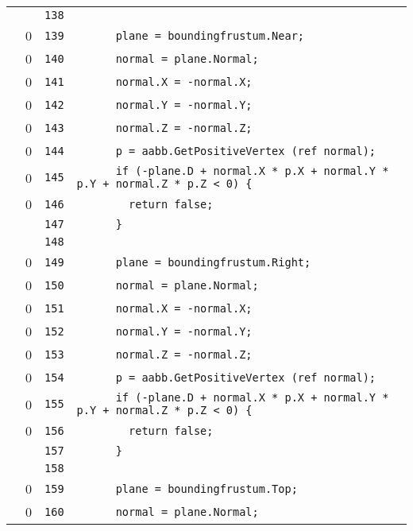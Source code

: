 \documentclass[a4paper,10pt]{article}
\begin{document}
\begin{longtable}[l]{lrrl}
\cellcolor{gray} &  & \verb~138~ & \verb~~\\
\cellcolor{red} & 0 & \verb~139~ & \verb~      plane = boundingfrustum.Near;~\\
\cellcolor{red} & 0 & \verb~140~ & \verb~      normal = plane.Normal;~\\
\cellcolor{red} & 0 & \verb~141~ & \verb~      normal.X = -normal.X;~\\
\cellcolor{red} & 0 & \verb~142~ & \verb~      normal.Y = -normal.Y;~\\
\cellcolor{red} & 0 & \verb~143~ & \verb~      normal.Z = -normal.Z;~\\
\cellcolor{red} & 0 & \verb~144~ & \verb~      p = aabb.GetPositiveVertex (ref normal);~\\
\cellcolor{red} & 0 & \verb~145~ & \verb~      if (-plane.D + normal.X * p.X + normal.Y * p.Y + normal.Z * p.Z < 0) {~\\
\cellcolor{red} & 0 & \verb~146~ & \verb~        return false;~\\
\cellcolor{gray} &  & \verb~147~ & \verb~      }~\\
\cellcolor{gray} &  & \verb~148~ & \verb~~\\
\cellcolor{red} & 0 & \verb~149~ & \verb~      plane = boundingfrustum.Right;~\\
\cellcolor{red} & 0 & \verb~150~ & \verb~      normal = plane.Normal;~\\
\cellcolor{red} & 0 & \verb~151~ & \verb~      normal.X = -normal.X;~\\
\cellcolor{red} & 0 & \verb~152~ & \verb~      normal.Y = -normal.Y;~\\
\cellcolor{red} & 0 & \verb~153~ & \verb~      normal.Z = -normal.Z;~\\
\cellcolor{red} & 0 & \verb~154~ & \verb~      p = aabb.GetPositiveVertex (ref normal);~\\
\cellcolor{red} & 0 & \verb~155~ & \verb~      if (-plane.D + normal.X * p.X + normal.Y * p.Y + normal.Z * p.Z < 0) {~\\
\cellcolor{red} & 0 & \verb~156~ & \verb~        return false;~\\
\cellcolor{gray} &  & \verb~157~ & \verb~      }~\\
\cellcolor{gray} &  & \verb~158~ & \verb~~\\
\cellcolor{red} & 0 & \verb~159~ & \verb~      plane = boundingfrustum.Top;~\\
\cellcolor{red} & 0 & \verb~160~ & \verb~      normal = plane.Normal;~\\

\end{longtable}
\end{document}
